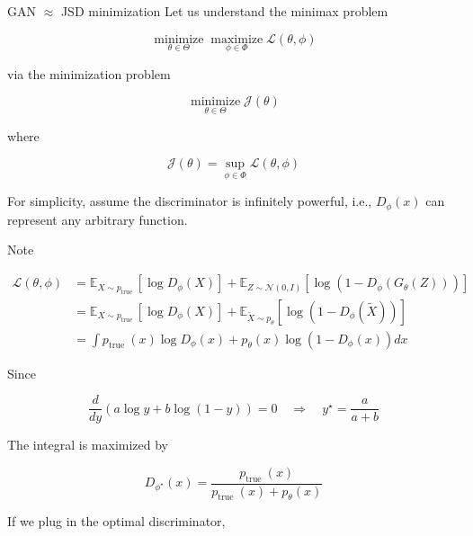 \begin{frame}[allowframebreaks]

\begin{myconceptblock}{12.17}{GAN $\approx$ JSD minimization}
    Let us understand the minimax problem

    $$
    \underset{\theta \in \Theta}{\operatorname{minimize}} \underset{\phi \in \Phi}{\operatorname{maximize}} \mathcal{L}(\theta, \phi)
    $$

    via the minimization problem

    $$
    \underset{\theta \in \Theta}{\operatorname{minimize}} \mathcal{J}(\theta)
    $$

    where

    $$
    \mathcal{J}(\theta)=\sup _{\phi \in \Phi} \mathcal{L}(\theta, \phi)
    $$

    For simplicity, assume the discriminator is infinitely powerful, i.e., $D_{\phi}(x)$ can represent any arbitrary function.

    \par\noindent\textcolor{gray}{\hdashrule{\textwidth}{0.4pt}{1pt 2pt}}

    Note

    $$
    \begin{aligned}
    \mathcal{L}(\theta, \phi) & =\mathbb{E}_{X \sim p_{\text {true }}}\left[\log D_{\phi}(X)\right]+\mathbb{E}_{Z \sim \mathcal{N}(0, I)}\left[\log \left(1-D_{\phi}\left(G_{\theta}(Z)\right)\right)\right] \\
    & =\mathbb{E}_{X \sim p_{\text {true }}}\left[\log D_{\phi}(X)\right]+\mathbb{E}_{\tilde{X} \sim p_{\theta}}\left[\log \left(1-D_{\phi}(\tilde{X})\right)\right] \\
    & =\int p_{\text {true }}(x) \log D_{\phi}(x)+p_{\theta}(x) \log \left(1-D_{\phi}(x)\right) d x
    \end{aligned}
    $$

    Since

    $$
    \frac{d}{d y}(a \log y+b \log (1-y))=0 \quad \Rightarrow \quad y^{\star}=\frac{a}{a+b}
    $$

    The integral is maximized by

    $$
    D_{\phi^{\star}}(x)=\frac{p_{\text {true }}(x)}{p_{\text {true }}(x)+p_{\theta}(x)}
    $$

    \par\noindent\textcolor{gray}{\hdashrule{\textwidth}{0.4pt}{1pt 2pt}}

    If we plug in the optimal discriminator,


\end{myconceptblock}
\end{frame}
